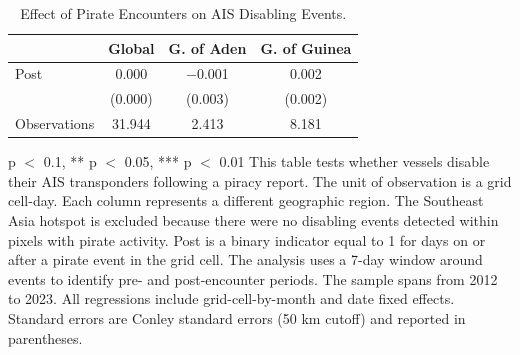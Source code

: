 \begin{table}
\centering
\caption{Effect of Pirate Encounters on AIS Disabling Events. \label{tab:ais-disabling}}
\centering
\begin{threeparttable}
\begin{tabular}[t]{lccc}
\toprule
  & Global & G. of Aden & G. of Guinea\\
\midrule
Post & \num{0.000} & \num{-0.001} & \num{0.002}\\
 & (\num{0.000}) & (\num{0.003}) & (\num{0.002})\\
Observations & \num{31,944} & \num{2,413} & \num{8,181}\\
\bottomrule
\end{tabular}
\begin{tablenotes}
\item \scriptsize * p $<$ 0.1, ** p $<$ 0.05, *** p $<$ 0.01 This table tests whether vessels disable their AIS transponders following a piracy report. The unit of observation is a grid cell-day. Each column represents a different geographic region. The Southeast Asia hotspot is excluded because there were no disabling events detected within pixels with pirate activity. Post is a binary indicator equal to 1 for days on or after a pirate event in the grid cell. The analysis uses a 7-day window around events to identify pre- and post-encounter periods. The sample spans from 2012 to 2023. All regressions include grid-cell-by-month and date fixed effects. Standard errors are Conley standard errors (50 km cutoff) and reported in parentheses.
\end{tablenotes}
\end{threeparttable}
\end{table}
